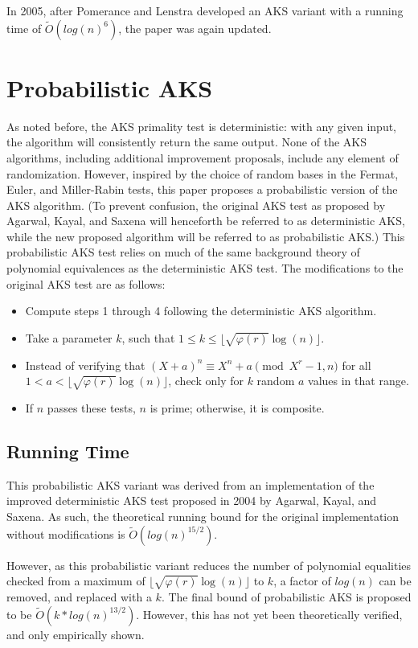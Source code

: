 \documentclass{article}
\begin{document}
In 2005, after Pomerance and Lenstra developed an AKS variant with a running time of $\widetilde{O}(log(n)^{6})$, the paper was again updated.

\section{Probabilistic AKS}

As noted before, the AKS primality test is deterministic: with any given input, the algorithm will consistently return the same output. None of the AKS algorithms, including additional improvement proposals, include any element of randomization. However, inspired by the choice of random bases in the Fermat, Euler, and Miller-Rabin tests, this paper proposes a probabilistic version of the AKS algorithm. (To prevent confusion, the original AKS test as proposed by Agarwal, Kayal, and Saxena will henceforth be referred to as deterministic AKS, while the new proposed algorithm will be referred to as probabilistic AKS.) This probabilistic AKS test relies on much of the same background theory of polynomial equivalences as the deterministic AKS test. The modifications to the original AKS test are as follows:

\begin{itemize}
    \item Compute steps 1 through 4 following the deterministic AKS algorithm.
    \item Take a parameter $k$, such that $1 \leq k \leq \lfloor \sqrt{\varphi(r)}\log(n) \rfloor$.
    \item Instead of verifying that $(X + a)^n \equiv X^n + a \pmod{X^r - 1, n}$ for all $1 < a < \lfloor \sqrt{\varphi(r)}\log(n) \rfloor$, check only for $k$ random $a$ values in that range.
    \item If $n$ passes these tests, $n$ is prime; otherwise, it is composite.
\end{itemize}

\subsection{Running Time}
This probabilistic AKS variant was derived from an implementation of the improved deterministic AKS test proposed in 2004 by Agarwal, Kayal, and Saxena. As such, the theoretical running bound for the original implementation without modifications is $\widetilde{O}(log(n)^{15/2})$.

However, as this probabilistic variant reduces the number of polynomial equalities checked from a maximum of $\lfloor \sqrt{\varphi(r)}\log(n) \rfloor$ to $k$, a factor of $log(n)$ can be removed, and replaced with a $k$. The final bound of probabilistic AKS is proposed to be $\widetilde{O}(k * log(n)^{13/2})$. However, this has not yet been theoretically verified, and only empirically shown.
\end{document}
